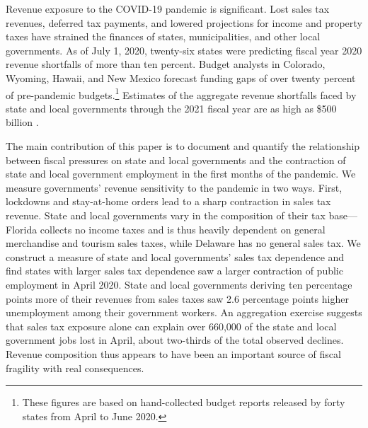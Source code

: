 Revenue exposure to the COVID-19 pandemic is significant. Lost sales tax revenues, deferred tax payments, and lowered projections for income and property taxes have strained the finances of states, municipalities, and other local governments. As of July 1, 2020, twenty-six states were predicting fiscal year 2020 revenue shortfalls of more than ten percent. Budget analysts in Colorado, Wyoming, Hawaii, and New Mexico forecast funding gaps of over twenty percent of pre-pandemic budgets.\footnote{These figures are based on hand-collected budget reports released by forty states from April to June 2020.}  Estimates of the aggregate revenue shortfalls faced by state and local governments through the 2021 fiscal year are as high as \$500 billion \citep{Whitaker:2020:LocalGovHelp}.

The main contribution of this paper is to document and quantify the relationship between fiscal pressures on state and local governments and the contraction of state and local government employment in the first months of the pandemic. We measure governments' revenue sensitivity to the pandemic in two ways. First, lockdowns and stay-at-home orders lead to a sharp contraction in sales tax revenue. State and local governments vary in the composition of their tax base---Florida collects no income taxes and is thus heavily dependent on general merchandise and tourism sales taxes, while Delaware has no general sales tax. We construct a measure of state and local governments' sales tax dependence and find states with larger sales tax dependence saw a larger contraction of public employment in April 2020. State and local governments deriving ten percentage points more of their revenues from sales taxes saw 2.6 percentage points higher unemployment among their government workers. An aggregation exercise suggests that sales tax exposure alone can explain over 660,000 of the state and local government jobs lost in April, about two-thirds of the total observed declines. Revenue composition thus appears to have been an important source of fiscal fragility with real consequences. 
    
